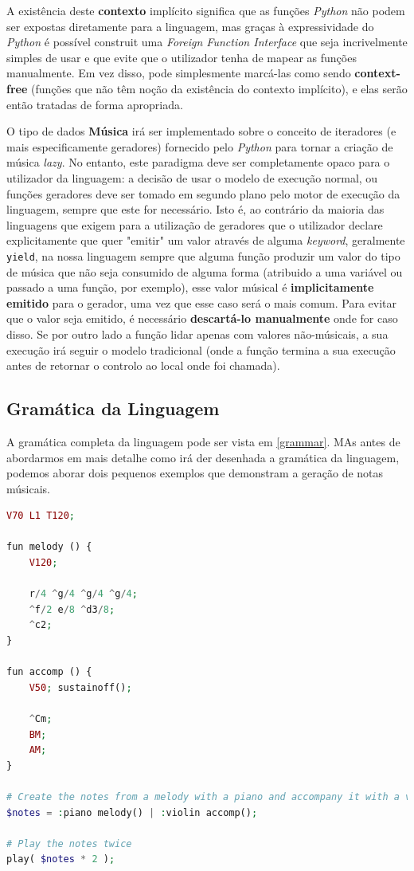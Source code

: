 \documentclass[
  oneside,
  11pt, a4paper,
  footinclude=true,
  headinclude=true,
  cleardoublepage=empty
]{scrbook}
\begin{document}
	A existência deste \textbf{contexto} implícito significa que as funções \textit{Python} não podem ser expostas diretamente para a linguagem, mas graças à expressividade do \textit{Python} é possível construit uma \textit{Foreign Function Interface} que seja incrivelmente simples de usar e que evite que o utilizador tenha de mapear as funções manualmente. Em vez disso, pode simplesmente marcá-las como sendo \textbf{context-free} (funções que não têm noção da existência do contexto implícito), e elas serão então tratadas de forma apropriada.
	
	O tipo de dados \textbf{Música} irá ser implementado sobre o conceito de iteradores (e mais especificamente geradores) fornecido pelo \textit{Python} para tornar a criação de música \textit{lazy}. No entanto, este paradigma deve ser completamente opaco para o utilizador da linguagem: a decisão de usar o modelo de execução normal, ou funções geradores deve ser tomado em segundo plano pelo motor de execução da linguagem, sempre que este for necessário. Isto é, ao contrário da maioria das linguagens que exigem para a utilização de geradores que o utilizador declare explicitamente que quer "emitir" um valor através de alguma \textit{keyword}, geralmente \texttt{yield}, na nossa linguagem sempre que alguma função produzir um valor do tipo de música que não seja consumido de alguma forma (atribuido a uma variável ou passado a uma função, por exemplo), esse valor músical é \textbf{implicitamente emitido} para o gerador, uma vez que esse caso será o mais comum. Para evitar que o valor seja emitido, é necessário \textbf{descartá-lo manualmente} onde for caso disso. Se por outro lado a função lidar apenas com valores não-músicais, a sua execução irá seguir o modelo tradicional (onde a função termina a sua execução antes de retornar o controlo ao local onde foi chamada).
    \newpage
	\subsection{Gramática da Linguagem}
	A gramática completa da linguagem pode ser vista em \ref{grammar}. MAs antes de abordarmos em mais detalhe como irá der desenhada a gramática da linguagem, podemos aborar dois pequenos exemplos que demonstram a geração de notas músicais.
\begin{lstlisting}[caption=Exemplo da sintaxe proposta da linguagem,language=PHP]
V70 L1 T120;

fun melody () {
    V120;
    
    r/4 ^g/4 ^g/4 ^g/4;
    ^f/2 e/8 ^d3/8; 
    ^c2;
}

fun accomp () {
    V50; sustainoff();

    ^Cm;
    BM; 
    AM;
}

# Create the notes from a melody with a piano and accompany it with a violin in parallel
$notes = :piano melody() | :violin accomp();

# Play the notes twice
play( $notes * 2 );
\end{lstlisting}
\end{document}

